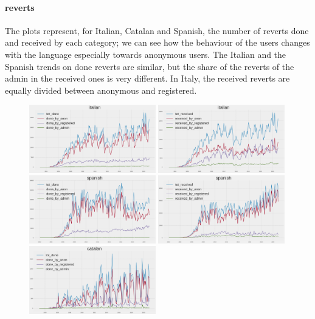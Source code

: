 \paragraph*{reverts}
The plots represent, for Italian, Catalan and Spanish, the number of reverts done and received by
each category; we can see how the behaviour of the users changes with the language especially
towards anonymous users. The Italian and the Spanish trends on done reverts are similar, but the share of
the reverts of the admin in the received ones is very different. In Italy, the received reverts are
equally divided between anonymous and registered.  
\begin{figure}[H]
    \centering
    \includegraphics[width=0.49\textwidth]{./chapters/04/assets/revert_done_it.png}
    \includegraphics[width=0.49\textwidth]{./chapters/04/assets/revert_received_it.png}
    \includegraphics[width=0.49\textwidth]{./chapters/04/assets/revert_done_es.png}
    \includegraphics[width=0.49\textwidth]{./chapters/04/assets/revert_received_es.png}
    \includegraphics[width=0.49\textwidth]{./chapters/04/assets/revert_done_ca.png}

\end{figure}
